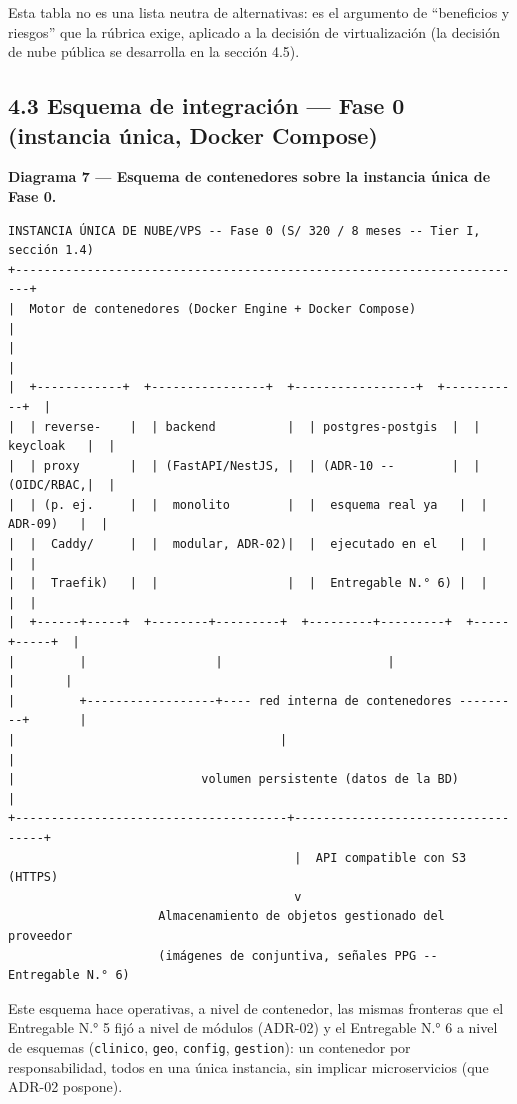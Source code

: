 \documentclass[11pt,a4paper]{article}
\begin{document}
Esta tabla no es una lista neutra de alternativas: es el argumento de ``beneficios y riesgos'' que la rúbrica exige, aplicado a la decisión de virtualización (la decisión de nube pública se desarrolla en la sección 4.5).

\subsection{4.3 Esquema de integración --- Fase 0 (instancia única, Docker Compose)}\label{esquema-de-integraciuxf3n-fase-0-instancia-uxfanica-docker-compose}

\textbf{Diagrama 7 --- Esquema de contenedores sobre la instancia única de Fase 0.}

\begin{samepage}\begin{verbatim}
INSTANCIA ÚNICA DE NUBE/VPS -- Fase 0 (S/ 320 / 8 meses -- Tier I, sección 1.4)
+------------------------------------------------------------------------+
|  Motor de contenedores (Docker Engine + Docker Compose)                    |
|                                                                            |
|  +------------+  +----------------+  +-----------------+  +-----------+  |
|  | reverse-    |  | backend          |  | postgres-postgis  |  | keycloak   |  |
|  | proxy       |  | (FastAPI/NestJS, |  | (ADR-10 --        |  | (OIDC/RBAC,|  |
|  | (p. ej.     |  |  monolito        |  |  esquema real ya   |  |  ADR-09)   |  |
|  |  Caddy/     |  |  modular, ADR-02)|  |  ejecutado en el   |  |            |  |
|  |  Traefik)   |  |                  |  |  Entregable N.° 6) |  |            |  |
|  +------+-----+  +--------+---------+  +---------+---------+  +-----+-----+  |
|         |                  |                       |                  |       |
|         +------------------+---- red interna de contenedores ---------+       |
|                                     |                                         |
|                          volumen persistente (datos de la BD)                 |
+--------------------------------------+-----------------------------------+
                                        |  API compatible con S3 (HTTPS)
                                        v
                     Almacenamiento de objetos gestionado del proveedor
                     (imágenes de conjuntiva, señales PPG -- Entregable N.° 6)
\end{verbatim}\end{samepage}

Este esquema hace operativas, a nivel de contenedor, las mismas fronteras que el Entregable N.° 5 fijó a nivel de módulos (ADR-02) y el Entregable N.° 6 a nivel de esquemas (\texttt{clinico}, \texttt{geo}, \texttt{config}, \texttt{gestion}): un contenedor por responsabilidad, todos en una única instancia, sin implicar microservicios (que ADR-02 pospone).
\end{document}
